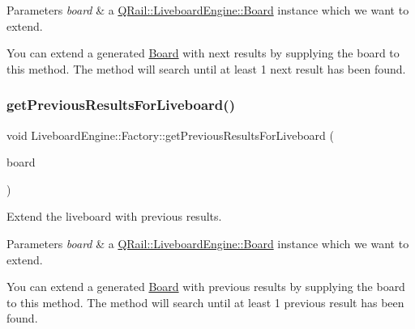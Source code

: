\begin{DoxyParams}{Parameters}
{\em board} & a \mbox{\hyperlink{classQRail_1_1LiveboardEngine_1_1Board}{Q\+Rail\+::\+Liveboard\+Engine\+::\+Board}} instance which we want to extend.\\
\hline
\end{DoxyParams}
You can extend a generated \mbox{\hyperlink{classQRail_1_1LiveboardEngine_1_1Board}{Board}} with next results by supplying the board to this method. The method will search until at least 1 next result has been found. \mbox{\label{classQRail_1_1LiveboardEngine_1_1Factory_a01901090bd5f8be7d6f7c7f52ed88db0}} 
\subsubsection{\texorpdfstring{getPreviousResultsForLiveboard()}{getPreviousResultsForLiveboard()}}
{\footnotesize\ttfamily void Liveboard\+Engine\+::\+Factory\+::get\+Previous\+Results\+For\+Liveboard (\begin{DoxyParamCaption}\item[{\mbox{\hyperlink{classQRail_1_1LiveboardEngine_1_1Board}{Q\+Rail\+::\+Liveboard\+Engine\+::\+Board}} $\ast$}]{board }\end{DoxyParamCaption})}



Extend the liveboard with previous results. 


\begin{DoxyParams}{Parameters}
{\em board} & a \mbox{\hyperlink{classQRail_1_1LiveboardEngine_1_1Board}{Q\+Rail\+::\+Liveboard\+Engine\+::\+Board}} instance which we want to extend.\\
\hline
\end{DoxyParams}
You can extend a generated \mbox{\hyperlink{classQRail_1_1LiveboardEngine_1_1Board}{Board}} with previous results by supplying the board to this method. The method will search until at least 1 previous result has been found. \mbox{\label{classQRail_1_1LiveboardEngine_1_1Factory_a03deeb607999848d402a5a3af40967f4}} 

